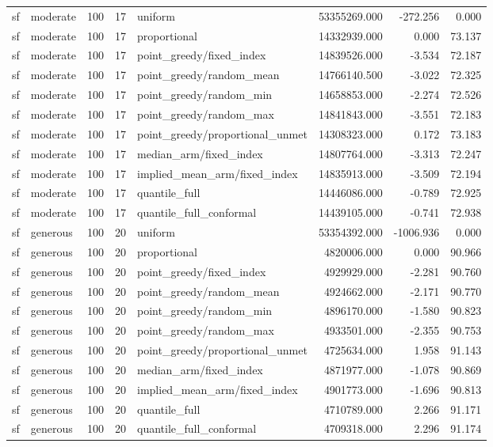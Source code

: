 \begin{tabular}{llrrlrrr}
sf & moderate & 100 & 17 & uniform & 53355269.000 & -272.256 & 0.000 \\
sf & moderate & 100 & 17 & proportional & 14332939.000 & 0.000 & 73.137 \\
sf & moderate & 100 & 17 & point\_greedy/fixed\_index & 14839526.000 & -3.534 & 72.187 \\
sf & moderate & 100 & 17 & point\_greedy/random\_mean & 14766140.500 & -3.022 & 72.325 \\
sf & moderate & 100 & 17 & point\_greedy/random\_min & 14658853.000 & -2.274 & 72.526 \\
sf & moderate & 100 & 17 & point\_greedy/random\_max & 14841843.000 & -3.551 & 72.183 \\
sf & moderate & 100 & 17 & point\_greedy/proportional\_unmet & 14308323.000 & 0.172 & 73.183 \\
sf & moderate & 100 & 17 & median\_arm/fixed\_index & 14807764.000 & -3.313 & 72.247 \\
sf & moderate & 100 & 17 & implied\_mean\_arm/fixed\_index & 14835913.000 & -3.509 & 72.194 \\
sf & moderate & 100 & 17 & quantile\_full & 14446086.000 & -0.789 & 72.925 \\
sf & moderate & 100 & 17 & quantile\_full\_conformal & 14439105.000 & -0.741 & 72.938 \\
sf & generous & 100 & 20 & uniform & 53354392.000 & -1006.936 & 0.000 \\
sf & generous & 100 & 20 & proportional & 4820006.000 & 0.000 & 90.966 \\
sf & generous & 100 & 20 & point\_greedy/fixed\_index & 4929929.000 & -2.281 & 90.760 \\
sf & generous & 100 & 20 & point\_greedy/random\_mean & 4924662.000 & -2.171 & 90.770 \\
sf & generous & 100 & 20 & point\_greedy/random\_min & 4896170.000 & -1.580 & 90.823 \\
sf & generous & 100 & 20 & point\_greedy/random\_max & 4933501.000 & -2.355 & 90.753 \\
sf & generous & 100 & 20 & point\_greedy/proportional\_unmet & 4725634.000 & 1.958 & 91.143 \\
sf & generous & 100 & 20 & median\_arm/fixed\_index & 4871977.000 & -1.078 & 90.869 \\
sf & generous & 100 & 20 & implied\_mean\_arm/fixed\_index & 4901773.000 & -1.696 & 90.813 \\
sf & generous & 100 & 20 & quantile\_full & 4710789.000 & 2.266 & 91.171 \\
sf & generous & 100 & 20 & quantile\_full\_conformal & 4709318.000 & 2.296 & 91.174 \\
\bottomrule
\end{tabular}
